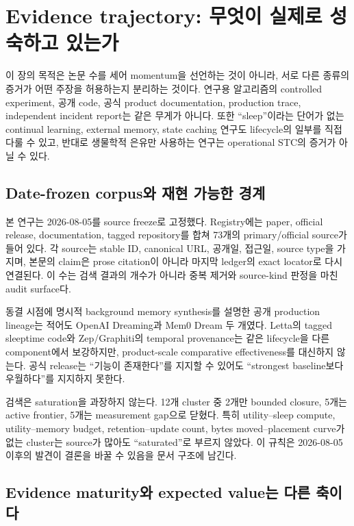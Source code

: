\chapter{Evidence trajectory: 무엇이 실제로 성숙하고 있는가}
\label{STC-S09}

이 장의 목적은 논문 수를 세어 momentum을 선언하는 것이 아니라, 서로 다른 종류의 증거가 어떤
주장을 허용하는지 분리하는 것이다. 연구용 알고리즘의 controlled experiment, 공개 code, 공식
product documentation, production trace, independent incident report는 같은 무게가 아니다. 또한
``sleep''이라는 단어가 없는 continual learning, external memory, state caching 연구도 lifecycle의
일부를 직접 다룰 수 있고, 반대로 생물학적 은유만 사용하는 연구는 operational STC의 증거가 아닐 수
있다.

\section{Date-frozen corpus와 재현 가능한 경계}

본 연구는 2026-08-05를 source freeze로 고정했다. Registry에는 paper, official release,
documentation, tagged repository를 합쳐 73개의 primary/official source가 들어 있다.
 각 source는 stable ID, canonical URL, 공개일, 접근일, source type을 가지며, 본문의
claim은 prose citation이 아니라 마지막 ledger의 exact locator로 다시 연결된다. 이 수는 검색 결과의
개수가 아니라 중복 제거와 source-kind 판정을 마친 audit surface다.

동결 시점에 명시적 background memory synthesis를 설명한 공개 production lineage는 적어도
OpenAI Dreaming과 Mem0 Dream 두 개였다.
\autocite{srcstc0052,srcstc0063} Letta의 tagged sleeptime code와 Zep/Graphiti의 temporal provenance는
같은 lifecycle을 다른 component에서 보강하지만, product-scale comparative effectiveness를 대신하지
않는다. 공식 release는 ``기능이 존재한다''를 지지할 수 있어도 ``strongest baseline보다 우월하다''를
지지하지 못한다.

검색은 saturation을 과장하지 않는다. 12개 cluster 중 2개만 bounded closure, 5개는 active frontier,
5개는 measurement gap으로 닫혔다. 특히 utility--sleep compute, utility--memory
budget, retention--update count, bytes moved--placement curve가 없는 cluster는 source가 많아도
``saturated''로 부르지 않았다. 이 규칙은 2026-08-05 이후의 발견이 결론을 바꿀 수 있음을 문서 구조에
남긴다.

\section{Evidence maturity와 expected value는 다른 축이다}

